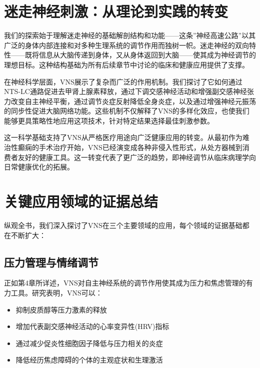 \documentclass[
  Letterpaper,
]{scrbook}
\providecommand{\tightlist}{%
  \setlength{\itemsep}{0pt}\setlength{\parskip}{0pt}}\usepackage{longtable,booktabs,array}
\begin{document}
\section{迷走神经刺激：从理论到实践的转变}\label{ux8ff7ux8d70ux795eux7ecfux523aux6fc0ux4eceux7406ux8bbaux5230ux5b9eux8df5ux7684ux8f6cux53d8}

我们的探索始于理解迷走神经的基础解剖结构和功能------这条''神经高速公路''以其广泛的身体内部连接和对多种生理系统的调节作用而独树一帜。迷走神经的双向特性------既将信息从大脑传递到身体，又从身体返回到大脑------使其成为神经调节的理想目标。这种结构基础为所有后续章节中讨论的临床和健康应用提供了支撑。

在神经科学层面，VNS展示了复杂而广泛的作用机制。我们探讨了它如何通过NTS-LC通路促进去甲肾上腺素释放，通过下调交感神经活动和增强副交感神经张力改变自主神经平衡，通过调节炎症反射降低全身炎症，以及通过增强神经元振荡的同步性促进大脑网络功能。这些机制不仅解释了VNS的多样化效应，也使我们能够更具策略性地应用这项技术，针对特定结果选择最佳刺激参数。

这一科学基础支持了VNS从严格医疗用途向广泛健康应用的转变。从最初作为难治性癫痫的手术治疗开始，VNS已经演变成各种非侵入性形式，从处方器械到消费者友好的健康工具。这一转变代表了更广泛的趋势，即神经调节从临床病理学向日常健康优化的拓展。

\section{关键应用领域的证据总结}\label{ux5173ux952eux5e94ux7528ux9886ux57dfux7684ux8bc1ux636eux603bux7ed3}

纵观全书，我们深入探讨了VNS在三个主要领域的应用，每个领域的证据基础都在不断扩大：

\subsection{压力管理与情绪调节}\label{ux538bux529bux7ba1ux7406ux4e0eux60c5ux7eeaux8c03ux8282}

正如第4章所详述，VNS对自主神经系统的调节作用使其成为压力和焦虑管理的有力工具。研究表明，VNS可以：

\begin{itemize}
\tightlist
\item
  抑制皮质醇等压力激素的释放
\item
  增加代表副交感神经活动的心率变异性(HRV)指标
\item
  通过减少促炎性细胞因子降低与压力相关的炎症
\item
  降低经历焦虑障碍的个体的主观症状和生理激活
\end{itemize}
\end{document}
